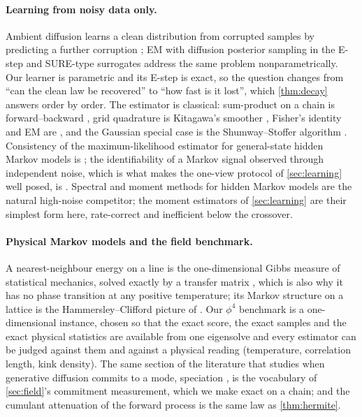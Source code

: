 \paragraph{Learning from noisy data only.}
Ambient diffusion learns a clean distribution from corrupted samples by predicting a further
corruption \citep{daras2023ambient,daras2024consistent}; EM with diffusion posterior sampling in
the E-step \citep{rozet2024learning,bai2024em} and SURE-type surrogates \citep{kawar2024gsure}
address the same problem nonparametrically. Our learner is parametric and its E-step is exact,
so the question changes from ``can the clean law be recovered'' to ``how fast is it lost'', which
\cref{thm:decay} answers order by order. The estimator is classical: sum-product on a chain is
forward--backward \citep{baum1970,rabiner1989tutorial}, grid quadrature is Kitagawa's smoother
\citep{kitagawa1987}, Fisher's identity and EM are \citet{dempster1977maximum,cappe2005}, and the
Gaussian special case is the Shumway--Stoffer algorithm \citep{shumway1982em}. Consistency of the
maximum-likelihood estimator for general-state hidden Markov models is \citet{douc2011consistency};
the identifiability of a Markov signal observed through independent noise, which is what makes
the one-view protocol of \cref{sec:learning} well posed, is \citet{gassiat2020identifiability}.
Spectral and moment methods for hidden Markov models \citep{hsu2012spectral} are the natural
high-noise competitor; the moment estimators of \cref{sec:learning} are their simplest form here,
rate-correct and inefficient below the crossover.

\paragraph{Physical Markov models and the field benchmark.}
A nearest-neighbour energy on a line is the one-dimensional Gibbs measure of statistical mechanics, solved
exactly by a transfer matrix \citep{ising1925beitrag}, which is also why it has no phase transition at any positive
temperature; its Markov structure on a lattice is the Hammersley--Clifford picture of \citet{besag1974spatial}.
Our $\phi^4$ benchmark is a one-dimensional instance, chosen so that the exact score, the exact samples and the
exact physical statistics are available from one eigensolve and every estimator can be judged against them and
against a physical reading (temperature, correlation length, kink density). The same section of the literature
that studies when generative diffusion commits to a mode, speciation \citep{biroli2024dynamical,achilli2026speciation},
is the vocabulary of \cref{sec:field}'s commitment measurement, which we make exact on a chain; and the cumulant
attenuation of the forward process \citep{aarts2025cumulants} is the same law as \cref{thm:hermite}.

